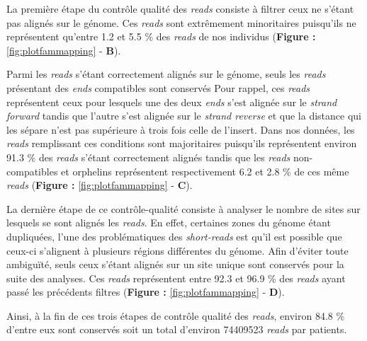 \documentclass[12pt,a4paper,twoside]{ugathesis}
\theoremstyle{definition}
\theoremstyle{definition}
\theoremstyle{definition}
\theoremstyle{remark}
\begin{document}
La première étape du contrôle qualité des \emph{reads} consiste à
filtrer ceux ne s'étant pas alignés sur le génome. Ces \emph{reads} sont
extrêmement minoritaires puisqu'ils ne représentent qu'entre 1.2 et 5.5
\% des \emph{reads} de nos individus (\textbf{Figure :
}\ref{fig:plotfammapping} - \textbf{B}).

Parmi les \emph{reads} s'étant correctement alignés sur le génome, seuls
les \emph{reads} présentant des \emph{ends} compatibles sont conservés
Pour rappel, ces \emph{reads} représentent ceux pour lesquels une des
deux \emph{ends} s'est alignée sur le \emph{strand forward} tandis que
l'autre s'est alignée sur le \emph{strand reverse} et que la distance
qui les sépare n'est pas supérieure à trois fois celle de l'insert. Dans
nos données, les \emph{reads} remplissant ces conditions sont
majoritaires puisqu'ils représentent environ 91.3 \% des \emph{reads}
s'étant correctement alignés tandis que les \emph{reads} non-compatibles
et orphelins représentent respectivement 6.2 et 2.8 \% de ces même
\emph{reads} (\textbf{Figure : }\ref{fig:plotfammapping} - \textbf{C}).

La dernière étape de ce contrôle-qualité consiste à analyser le nombre
de sites sur lesquels se sont alignés les \emph{reads}. En effet,
certaines zones du génome étant dupliquées, l'une des problématiques des
\emph{short-reads} est qu'il est possible que ceux-ci s'alignent à
plusieurs régions différentes du génome. Afin d'éviter toute ambiguïté,
seuls ceux s'étant alignés sur un site unique sont conservés pour la
suite des analyses. Ces \emph{reads} représentent entre 92.3 et 96.9 \%
des \emph{reads} ayant passé les précédents filtres (\textbf{Figure :
}\ref{fig:plotfammapping} - \textbf{D}).

Ainsi, à la fin de ces trois étapes de contrôle qualité des
\emph{reads}, environ 84.8 \% d'entre eux sont conservés soit un total
d'environ 74409523 \emph{reads} par patients.

\newpage 
\end{document}
